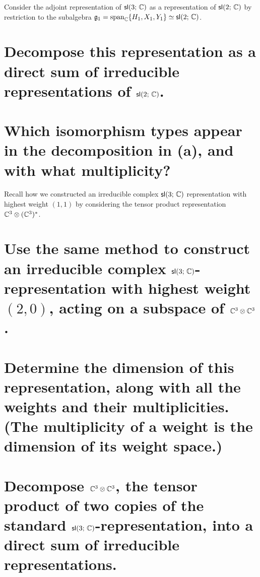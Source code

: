 \documentclass[
	pages,
	boxes,
	color=WildStrawberry
]{homework}
\begin{document}
\begin{problem}
Consider the adjoint representation of $\mathsf{sl}(3;\, \mathbb{C})$ as a representation of $\mathsf{sl}(2;\, \mathbb{C})$ by restriction to the subalgebra $\mathfrak{g}_1 = \operatorname{span}_{\mathbb{C}}\{H_1, X_1, Y_1\} \simeq \mathsf{sl}(2;\, \mathbb{C})$.
\begin{parts}
	\part{Decompose this representation as a direct sum of irreducible representations of $\mathsf{sl}(2;\, \mathbb{C})$.}\label{part:1a}
	\part{Which isomorphism types appear in the decomposition in (a), and with what multiplicity?}\label{part:1b}
\end{parts}
\end{problem}

\begin{problem}
Recall how we constructed an irreducible complex $\mathsf{sl}(3;\, \mathbb{C})$ representation with highest weight $(1, 1)$ by considering the tensor product representation $\mathbb{C}^3 \otimes (\mathbb{C}^3)^*$.
\begin{parts}
	\part{Use the same method to construct an irreducible complex $\mathsf{sl}(3;\, \mathbb{C})$-representation with highest weight $(2, 0)$, acting on a subspace of $\mathbb{C}^3 \otimes \mathbb{C}^3$.}\label{part:2a}
	\part{Determine the dimension of this representation, along with all the weights and their multiplicities. (The multiplicity of a weight is the dimension of its weight space.)}\label{part:2b}
	\part{Decompose $\mathbb{C}^3 \otimes \mathbb{C}^3$, the tensor product of two copies of the standard $\mathsf{sl}(3;\, \mathbb{C})$-representation, into a direct sum of irreducible representations.}\label{part:2c}
\end{parts}
\end{problem}
\end{document}
